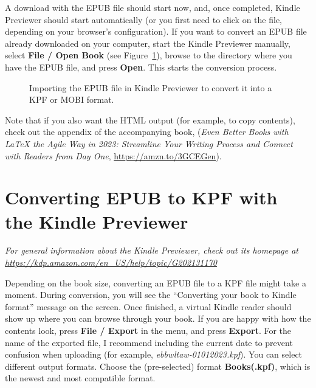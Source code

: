 A download with the EPUB file should start now, and, once completed, Kindle Previewer should start automatically (or you first need to click on the file, depending on your browser's configuration). If you want to convert an EPUB file already downloaded on your computer, start the Kindle Previewer manually, select \textbf{File / Open Book} (see Figure~\ref{kindlepreviewer:fig}), browse to the directory where you have the EPUB file, and press \textbf{Open}. This starts the conversion process.

\begin{figure}[H]\centering
{}
\caption{Importing the EPUB file in Kindle Previewer to convert it into a KPF or MOBI format.}
\label{kindlepreviewer:fig}
\end{figure}

Note that if you also want the HTML output (for example, to copy contents), check out the appendix of the accompanying book, (\textit{Even Better Books with LaTeX the Agile Way in 2023: Streamline Your Writing Process and Connect with Readers from Day One}, \url{https://amzn.to/3GCEGen}).


\section{Converting EPUB to KPF with the Kindle Previewer}

\textit{For general information about the Kindle Previewer, check out its homepage at \url{https://kdp.amazon.com/en_US/help/topic/G202131170}}

Depending on the book size, converting an EPUB file to a KPF file might take a moment. During conversion, you will see the ``Converting your book to Kindle format'' message on the screen. Once finished, a virtual Kindle reader should show up where you can browse through your book. If you are happy with how the contents look, press \textbf{File / Export} in the menu, and press \textbf{Export}. For the name of the exported file, I recommend including the current date to prevent confusion when uploading (for example, \textit{ebbwltaw-01012023.kpf}). You can select different output formats. Choose the (pre-selected) format \textbf{Books(.kpf)}, which is the newest and most compatible format.

